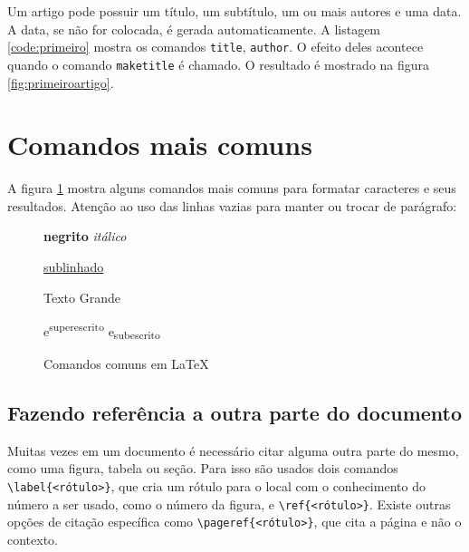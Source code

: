 Um artigo pode possuir um título, um subtítulo, um ou mais autores e uma data. A data, se não for colocada, é gerada automaticamente. A listagem \ref{code:primeiro} mostra os comandos \lstinline|title|, \lstinline|author|. O efeito deles acontece quando o comando \lstinline|maketitle| é chamado. O resultado é mostrado na figura \ref{fig:primeiroartigo}.

\section{Comandos mais comuns}

A figura \ref{fig:com:comum} mostra alguns comandos mais comuns para
formatar caracteres e seus resultados. Atenção ao uso das
linhas vazias para manter ou trocar de parágrafo:

\begin{figure}[hbt]
    \begin{LTXexample}[pos=b]
\textbf{negrito} 
\textit{itálico}

\underline{sublinhado}

\Large
Texto Grande
\normalsize

e\textsuperscript{superescrito}
e\textsubscript{subescrito}
    \end{LTXexample}
    \caption{Comandos comuns em \LaTeX}
    \label{fig:com:comum}
\end{figure}

\subsection{Fazendo referência a outra parte do documento}

Muitas vezes em um documento é necessário citar alguma outra parte do mesmo, como uma figura, tabela ou seção. Para isso são usados dois comandos \lstinline|\label{<rótulo>}|, que cria um rótulo para o local com o conhecimento do número a ser usado, como o número da figura, e \lstinline|\ref{<rótulo>}|. Existe outras opções de citação específica como \lstinline|\pageref{<rótulo>}|, que cita a página e não o contexto.



